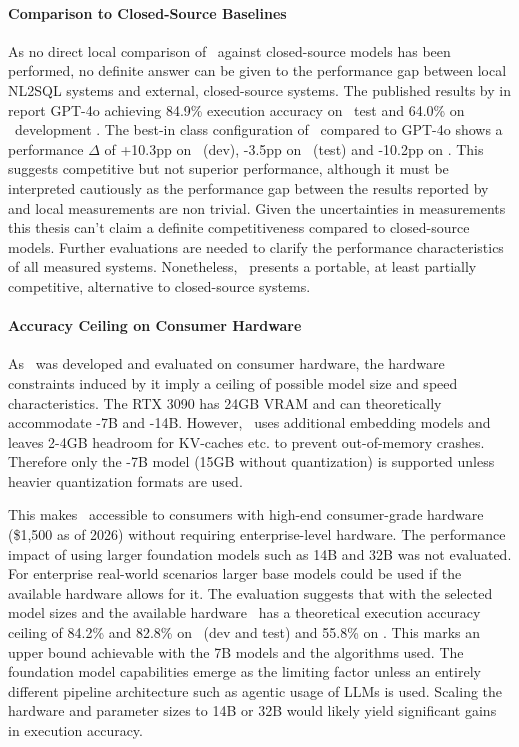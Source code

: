 \paragraph{Comparison to Closed-Source Baselines}

As no direct local comparison of \Natural~against closed-source models has been
performed, no definite answer can be given to the performance gap between
local NL2SQL systems and external, closed-source systems. The published results
by \citeauthor{OmniSQL} in \citeyear{OmniSQL} report GPT-4o achieving 84.9\%
execution accuracy on \Spider~test and 64.0\% on \Bird~development
\citep{OmniSQL}. The best-in class configuration of \Natural~compared to GPT-4o
shows a performance $\Delta$ of +10.3pp on \Spider~(dev), -3.5pp on
\Spider~(test) and -10.2pp on \Bird. This suggests competitive but not superior
performance, although it must be interpreted cautiously as the performance gap
between the results reported by \cite{OmniSQL} and local measurements are non
trivial. Given the uncertainties in measurements this thesis can't claim a
definite competitiveness compared to closed-source models. Further evaluations
are needed to clarify the performance characteristics of all measured systems.
Nonetheless, \Natural~presents a portable, at least partially competitive,
alternative to closed-source systems.

\paragraph{Accuracy Ceiling on Consumer Hardware}

As \Natural~was developed and evaluated on consumer hardware, the hardware
constraints induced by it imply a ceiling of possible model size and speed
characteristics. The RTX 3090 has 24GB VRAM and can theoretically accommodate
\OmniSQL-7B and \OmniSQL-14B. However, \Natural~uses additional embedding
models and leaves 2-4GB headroom for KV-caches etc. to prevent out-of-memory
crashes. Therefore only the \OmniSQL-7B model (15GB without quantization) is
supported unless heavier quantization formats are used.

This makes \Natural~accessible to consumers with high-end consumer-grade
hardware (\$1,500 as of 2026) without requiring enterprise-level hardware. The
performance impact of using larger foundation models such as 14B and 32B was
not evaluated. For enterprise real-world scenarios larger base models could be
used if the available hardware allows for it. The evaluation suggests that with
the selected model sizes and the available hardware \Natural~has a theoretical
execution accuracy ceiling of 84.2\% and 82.8\% on \Spider~(dev and test) and
55.8\% on \Bird. This marks an upper bound achievable with the 7B models and
the algorithms used. The foundation model capabilities emerge as the limiting
factor unless an entirely different pipeline architecture such as agentic usage
of LLMs is used. Scaling the hardware and parameter sizes to 14B or 32B would
likely yield significant gains in execution accuracy. 

